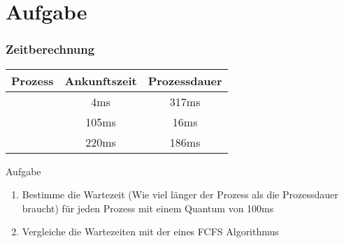 \section{Aufgabe}

\begin{frame}
    \frametitle{Zeitberechnung}

    \begin{table}[]
        \begin{tabular}{c|c|c}
            \textbf{Prozess} & \textbf{Ankunftszeit} & \textbf{Prozessdauer} \\
            \hline{}
            \PZero{}         & 4ms                   & 317ms                 \\
            \POne{}          & 105ms                 & 16ms                  \\
            \PTwo{}          & 220ms                 & 186ms
        \end{tabular}
    \end{table}

    \begin{block}{Aufgabe}
        \begin{enumerate}
            \item Bestimme die Wartezeit (Wie viel l{\"a}nger der Prozess als die Prozessdauer braucht) f{\"u}r jeden Prozess mit einem Quantum von 100ms
            \item Vergleiche die Wartezeiten mit der eines FCFS Algorithmus
        \end{enumerate}
    \end{block}

\end{frame}

